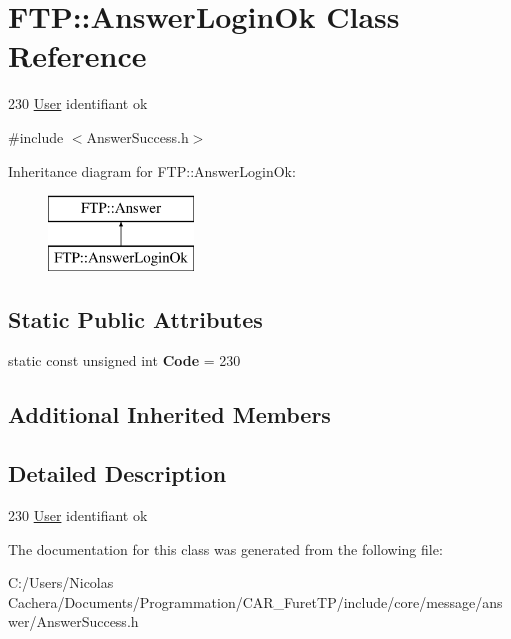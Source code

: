 \hypertarget{classFTP_1_1AnswerLoginOk}{}\section{F\+T\+P\+:\+:Answer\+Login\+Ok Class Reference}
\label{classFTP_1_1AnswerLoginOk}


230 \hyperlink{structFTP_1_1User}{User} identifiant ok  




{\ttfamily \#include $<$Answer\+Success.\+h$>$}

Inheritance diagram for F\+T\+P\+:\+:Answer\+Login\+Ok\+:\begin{figure}[H]
\begin{center}
\leavevmode
\includegraphics[height=2.000000cm]{classFTP_1_1AnswerLoginOk}
\end{center}
\end{figure}
\subsection*{Static Public Attributes}
\begin{DoxyCompactItemize}
\item 
\hypertarget{classFTP_1_1AnswerLoginOk_a5931c280d254e2cddbab352d225f2398}{}static const unsigned int {\bfseries Code} = 230\label{classFTP_1_1AnswerLoginOk_a5931c280d254e2cddbab352d225f2398}

\end{DoxyCompactItemize}
\subsection*{Additional Inherited Members}


\subsection{Detailed Description}
230 \hyperlink{structFTP_1_1User}{User} identifiant ok 

The documentation for this class was generated from the following file\+:\begin{DoxyCompactItemize}
\item 
C\+:/\+Users/\+Nicolas Cachera/\+Documents/\+Programmation/\+C\+A\+R\+\_\+\+Furet\+T\+P/include/core/message/answer/Answer\+Success.\+h\end{DoxyCompactItemize}
